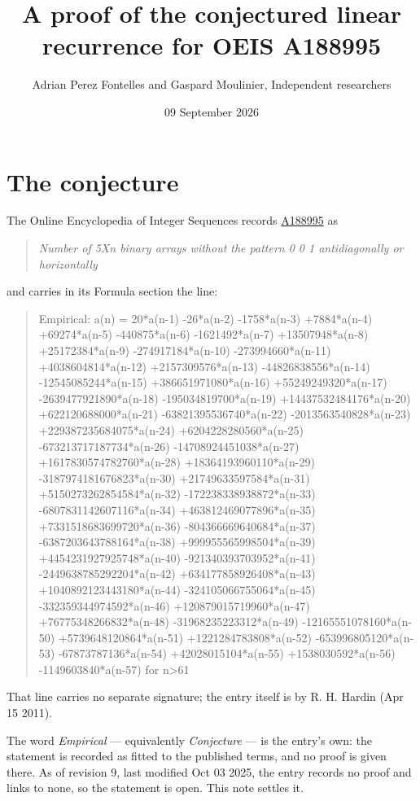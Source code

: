\documentclass[11pt]{article}
\title{A proof of the conjectured linear recurrence for OEIS A188995}
\author{Adrian Perez Fontelles and Gaspard Moulinier, Independent researchers}
\date{09 September 2026}
\theoremstyle{definition}
\begin{document}
\maketitle
\section{The conjecture}

The Online Encyclopedia of Integer Sequences records \href{https://oeis.org/A188995}{A188995} as

\begin{quote}\itshape Number of 5Xn binary arrays without the pattern 0 0 1 antidiagonally or horizontally\end{quote}

and carries in its Formula section the line:

\begin{quote}\ttfamily Empirical: a(n) = 20*a(n-1) -26*a(n-2) -1758*a(n-3) +7884*a(n-4) +69274*a(n-5) -440875*a(n-6) -1621492*a(n-7) +13507948*a(n-8) +25172384*a(n-9) -274917184*a(n-10) -273994660*a(n-11) +4038604814*a(n-12) +2157309576*a(n-13) -44826838556*a(n-14) -12545085244*a(n-15) +386651971080*a(n-16) +55249249320*a(n-17) -2639477921890*a(n-18) -195034819700*a(n-19) +14437532484176*a(n-20) +622120688000*a(n-21) -63821395536740*a(n-22) -2013563540828*a(n-23) +229387235684075*a(n-24) +6204228280560*a(n-25) -673213717187734*a(n-26) -14708924451038*a(n-27) +1617830574782760*a(n-28) +18364193960110*a(n-29) -3187974181676823*a(n-30) +21749633597584*a(n-31) +5150273262854584*a(n-32) -172238338938872*a(n-33) -6807831142607116*a(n-34) +463812469077896*a(n-35) +7331518683699720*a(n-36) -804366669640684*a(n-37) -6387203643788164*a(n-38) +999955565998504*a(n-39) +4454231927925748*a(n-40) -921340393703952*a(n-41) -2449638785292204*a(n-42) +634177858926408*a(n-43) +1040892123443180*a(n-44) -324105066755064*a(n-45) -332359344974592*a(n-46) +120879015719960*a(n-47) +76775348266832*a(n-48) -31968235223312*a(n-49) -12165551078160*a(n-50) +5739648120864*a(n-51) +1221284783808*a(n-52) -653996805120*a(n-53) -67873787136*a(n-54) +42028015104*a(n-55) +1538030592*a(n-56) -1149603840*a(n-57) for n>61\end{quote}

That line carries no separate signature; the entry itself is by R. H. Hardin (Apr 15 2011).

The word {\itshape Empirical} --- equivalently {\itshape Conjecture} --- is the entry's own: the statement is recorded as fitted to the published terms, and no proof is given there. As of revision 9, last modified Oct 03 2025, the entry records no proof and links to none, so the statement is open. This note settles it.
\end{document}
